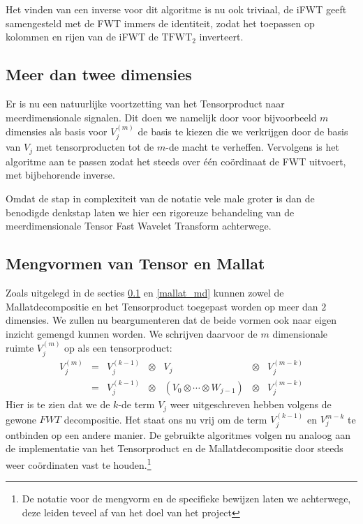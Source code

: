 Het vinden van een inverse voor dit algoritme is nu ook triviaal, de iFWT geeft samengesteld met de FWT
immers de identiteit, zodat het toepassen op kolommen en rijen van de iFWT de $\mathrm{TFWT}_2$ inverteert.

\subsection{Meer dan twee dimensies}
\label{tensor_md}
Er is nu een natuurlijke voortzetting van het Tensorproduct naar meerdimensionale signalen.
Dit doen we namelijk door voor bijvoorbeeld $m$ dimensies als basis voor $V^{(m)}_j$ de basis te kiezen die we verkrijgen 
door de basis van $V_j$ met tensorproducten tot de $m$-de macht te verheffen.
Vervolgens is het algoritme aan te passen zodat het steeds over \'e\'en co\"ordinaat de FWT uitvoert, 
met bijbehorende inverse.

Omdat de stap in complexiteit van de notatie vele male groter is dan de benodigde denkstap laten we hier een rigoreuze
behandeling van de meerdimensionale Tensor Fast Wavelet Transform achterwege.

\subsection{Mengvormen van Tensor en Mallat}
Zoals uitgelegd in de secties \ref{tensor_md} en \ref{mallat_md} kunnen zowel de Mallatdecompositie en 
het Tensorproduct toegepast worden op meer dan $2$ dimensies. We zullen nu beargumenteren dat de beide
vormen ook naar eigen inzicht gemengd kunnen worden. We schrijven daarvoor de $m$ dimensionale 
ruimte $V_j^{(m)}$ op als een tensorproduct:
\begin{equation*}
\begin{array}{ccccccc}
  V_j^{(m)} &=& V_j^{(k-1)} &\otimes&              V_j                     &\otimes& V_j^{(m-k)} \\
            &=& V_j^{(k-1)} &\otimes& (V_0 \otimes \cdots \otimes W_{j-1}) &\otimes& V_j^{(m-k)}
\end{array}
\end{equation*}
Hier is te zien dat we de $k$-de term $V_j$ weer uitgeschreven hebben volgens de gewone $FWT$
decompositie. Het staat ons nu vrij om de term $V_j^{(k-1)}$ en $V_j^{m-k}$ te ontbinden
op een andere manier. De gebruikte algoritmes volgen nu analoog aan de implementatie van het Tensorproduct
en de Mallatdecompositie door steeds weer co\"ordinaten vast te houden.\footnote{De notatie voor de mengvorm en de specifieke bewijzen laten we achterwege, deze leiden teveel af van het
doel van het project }

